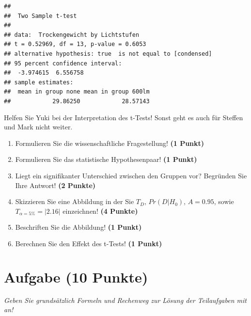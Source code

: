 \documentclass[a4paper, 9pt]{scrartcl}\usepackage[]{graphicx}\usepackage[]{xcolor}
\makeatletter
\newenvironment{kframe}{%
 \def\at@end@of@kframe{}%
 \ifinner\ifhmode%
  \def\at@end@of@kframe{\end{minipage}}%
  \begin{minipage}{\columnwidth}%
 \fi\fi%
 \def\FrameCommand##1{\hskip\@totalleftmargin \hskip-\fboxsep
 \colorbox{shadecolor}{##1}\hskip-\fboxsep
     \hskip-\linewidth \hskip-\@totalleftmargin \hskip\columnwidth}%
 \MakeFramed {\advance\hsize-\width
   \@totalleftmargin\z@ \linewidth\hsize
   \@setminipage}}%
 {\par\unskip\endMakeFramed%
 \at@end@of@kframe}
\newenvironment{knitrout}{}{} %
\makeatother
\begin{document}
\begin{knitrout}
\color{fgcolor}\begin{kframe}
\begin{verbatim}
## 
## 	Two Sample t-test
## 
## data:  Trockengewicht by Lichtstufen
## t = 0.52969, df = 13, p-value = 0.6053
## alternative hypothesis: true  is not equal to [condensed]
## 95 percent confidence interval:
##  -3.974615  6.556758
## sample estimates:
##  mean in group none mean in group 600lm 
##            29.86250            28.57143
\end{verbatim}
\end{kframe}
\end{knitrout}

Helfen Sie Yuki bei der Interpretation des t-Tests! Sonst geht es auch für Steffen und Mark nicht weiter.
  
\begin{enumerate}
  \item Formulieren Sie die wissenschaftliche Fragestellung! \textbf{(1 Punkt)}
  \item Formulieren Sie das statistische Hypothesenpaar! \textbf{(1 Punkt)}
\item Liegt ein signifikanter Unterschied zwischen den Gruppen vor? Begründen Sie Ihre Antwort! \textbf{(2 Punkte)}
\item Skizzieren Sie eine Abbildung in der Sie $T_{D}$, $Pr(D|H_0)$, $A=0.95$, sowie $T_{\alpha=5\%} = |2.16|$ einzeichnen! \textbf{(4 Punkte)}
\item Beschriften Sie die Abbildung! \textbf{(1 Punkt)}  
\item Berechnen Sie den Effekt des t-Tests! \textbf{(1 Punkt)}
\end{enumerate} 
\clearpage

\section{Aufgabe \hfill (10 Punkte)}

\textit{Geben Sie grundsätzlich Formeln und Rechenweg zur Lösung der Teilaufgaben mit an!} \\[1Ex]
 
\end{document}
